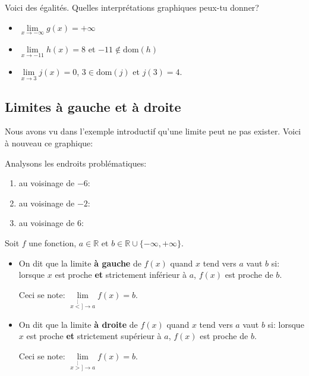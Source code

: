 \documentclass[a4paper,12pt]{report}
\newcommand{\IR}{\mathbb{R}}
\newcommand{\dom}{\mathrm{dom}}
\newcommand{\tog}{\stackrel[<]{}{\to}}
\newcommand{\tod}{\stackrel[>]{}{\to}}
\newcommand{\pinf}{+\infty}
\newcommand{\minf}{-\infty}
\begin{document}
\begin{exercice}
Voici des égalités. Quelles interprétations graphiques peux-tu donner?

\begin{itemize}
\item \(\lim\limits_{x\to\minf}g(x)=\pinf\)
\item \(\lim\limits_{x\to -11}h(x)=8\) et \(-11\notin \dom(h)\)
\item \(\lim\limits_{x\to 3}j(x)=0\), \(3\in\dom(j)\) et \(j(3)=4\).
\end{itemize}
\end{exercice}
\subsection{Limites à gauche et à droite}
\label{sec:org45889b0}
Nous avons vu dans l'exemple introductif qu'une limite peut ne pas
exister. Voici à nouveau ce graphique:

\begin{center}

\end{center}

Analysons les endroits problématiques:

\begin{enumerate}
\item au voisinage de \(-6\):\dotfill

\dotfill

\dotfill
\item au voisinage de \(-2\):\dotfill

\dotfill

\dotfill
\item au voisinage de \(6\):\dotfill

\dotfill

\dotfill
\end{enumerate}


\begin{definition}
Soit \(f\) une fonction, \(a\in\IR\) et \(b\in\IR\cup\{-\infty,+\infty\}\).
\begin{itemize}
\item On dit que la limite \textbf{à gauche} de \(f(x)\) quand \(x\) tend vers
\(a\) vaut \(b\) si: lorsque \(x\) est proche \textbf{et} strictement
inférieur à \(a\), \(f(x)\) est proche de \(b\).

Ceci se note: \(\lim\limits_{x\tog a}f(x)=b\).

\item On dit que la limite \textbf{à droite} de \(f(x)\) quand \(x\) tend vers
\(a\) vaut \(b\) si: lorsque \(x\) est proche \textbf{et} strictement
supérieur à \(a\), \(f(x)\) est proche de \(b\).

Ceci se note: \(\lim\limits_{x\tod a}f(x)=b\).
\end{itemize}
\end{definition}
\end{document}

